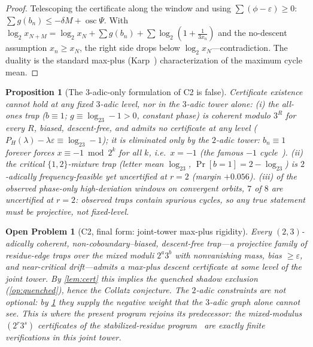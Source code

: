 \documentclass[11pt]{article}
\theoremstyle{plain}
\newtheorem{proposition}{Proposition}
\newtheorem{openproblem}{Open Problem}
\theoremstyle{definition}
\theoremstyle{remark}
\begin{document}
\begin{proof}
Telescoping the certificate along the window and using
$\sum(\phi-\varepsilon)\ge0$: $\sum g(b_n)\le-\delta M+
\operatorname{osc}\Psi$. With
$\log_2x_{N+M}=\log_2x_N+\sum g(b_n)+\sum\log_2(1+\frac1{3x_n})$ and the
no-descent assumption $x_n\ge x_N$, the right side drops below
$\log_2x_N$---contradiction. The duality is the standard max-plus
(Karp~\cite{karp1978}) characterization of the maximum cycle mean.
\end{proof}

\begin{proposition}[The $3$-adic-only formulation of C2 is false]
\label{prop:notthreeadic}
Certificate existence cannot hold at any fixed $3$-adic level, nor in
the $3$-adic tower alone:
\emph{(i)} the all-ones trap ($b\equiv1$; $g\equiv\log_23-1>0$, constant
phase) is coherent modulo $3^R$ for every $R$, biased, descent-free, and
admits no certificate at any level
($P_H(\lambda)-\lambda\varepsilon\equiv\log_23-1$); it is eliminated
\emph{only} by the $2$-adic tower: $b_n\equiv1$ forever forces
$x\equiv-1\bmod2^k$ for all $k$, i.e.\ $x=-1$ (the famous $-1$
cycle~\cite{lagarias1985}).
\emph{(ii)} the critical $\{1,2\}$-mixture trap (letter mean $\log_23$,
$\Pr[b{=}1]=2-\log_23$) is $2$-adically frequency-feasible yet
uncertified at $r=2$ (margin $+0.056$). \emph{(iii)} of the observed
phase-only high-deviation windows on convergent orbits, $7$ of $8$ are
uncertified at $r=2$: observed traps contain spurious cycles, so any
true statement must be projective, not fixed-level.
\end{proposition}

\begin{openproblem}[C2, final form: joint-tower max-plus rigidity]
\label{op:ctwo}
Every $(2,3)$-adically coherent, non-coboundary--biased, descent-free
trap---a projective family of residue-edge traps over the \emph{mixed}
moduli $2^a3^b$ with nonvanishing mass, bias $\ge\varepsilon$, and
near-critical drift---admits a max-plus descent certificate at some
level of the joint tower. By \cref{lem:cert} this implies the quenched
shadow exclusion (\cref{op:quenched}), hence the Collatz conjecture. The
$2$-adic constraints are not optional: by \cref{prop:notthreeadic} they
supply the negative weight that the $3$-adic graph alone cannot see.
This is where the present program rejoins its predecessor: the
mixed-modulus $(2^r3^s)$ certificates of the stabilized-residue
program~\cite{srce} are exactly finite verifications in this joint tower.
\end{openproblem}
\end{document}
